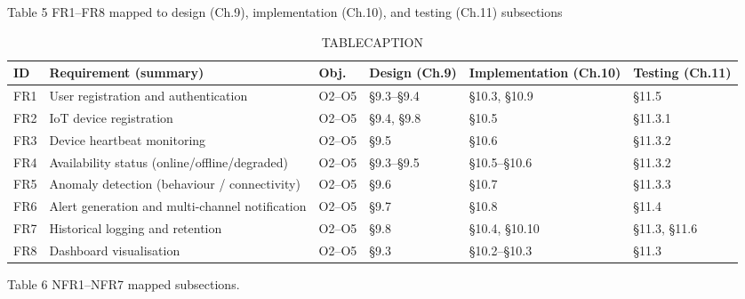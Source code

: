 Table 5 FR1--FR8 mapped to design (Ch.9), implementation (Ch.10), and testing (Ch.11) subsections

\begin{table}[htbp]
  \centering
  \small
  \caption{TABLECAPTION}
  \label{tab:ICA1PLACEHOLDER}
\begin{tabular}{p{}p{}p{}p{}p{}p{}}
\toprule
ID & Requirement (summary) & Obj. & Design (Ch.9) & Implementation (Ch.10) & Testing (Ch.11) \\
\midrule
FR1 & User registration and authentication & O2--O5 & \S{}9.3--\S{}9.4 & \S{}10.3, \S{}10.9 & \S{}11.5 \\
\midrule
FR2 & IoT device registration & O2--O5 & \S{}9.4, \S{}9.8 & \S{}10.5 & \S{}11.3.1 \\
\midrule
FR3 & Device heartbeat monitoring & O2--O5 & \S{}9.5 & \S{}10.6 & \S{}11.3.2 \\
\midrule
FR4 & Availability status (online/offline/degraded) & O2--O5 & \S{}9.3--\S{}9.5 & \S{}10.5--\S{}10.6 & \S{}11.3.2 \\
\midrule
FR5 & Anomaly detection (behaviour / connectivity) & O2--O5 & \S{}9.6 & \S{}10.7 & \S{}11.3.3 \\
\midrule
FR6 & Alert generation and multi-channel notification & O2--O5 & \S{}9.7 & \S{}10.8 & \S{}11.4 \\
\midrule
FR7 & Historical logging and retention & O2--O5 & \S{}9.8 & \S{}10.4, \S{}10.10 & \S{}11.3, \S{}11.6 \\
\midrule
FR8 & Dashboard visualisation & O2--O5 & \S{}9.3 & \S{}10.2--\S{}10.3 & \S{}11.3 \\
\bottomrule
\end{tabular}
\end{table}

Table 6 NFR1--NFR7 mapped subsections.

